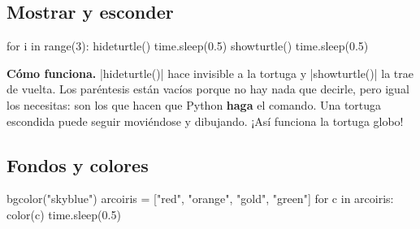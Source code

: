 \subsection*{Mostrar y esconder}

\begin{tcbraster}[raster columns=2, raster equal height=rows, raster column skip=12pt, raster valign=center]
\begin{tcolorbox}[colback=white, colframe=white, boxrule=0pt, valign=center]
\begin{scratch}
\end{scratch}
\end{tcolorbox}
\begin{code}
for i in range(3):
    hideturtle()
    time.sleep(0.5)
    showturtle()
    time.sleep(0.5)
\end{code}
\end{tcbraster}

\textbf{Cómo funciona.} \py|hideturtle()| hace invisible a la tortuga y \py|showturtle()| la trae de vuelta. Los paréntesis están vacíos porque no hay nada que decirle, pero igual los necesitas: son los que hacen que Python \textbf{haga} el comando. Una tortuga escondida puede seguir moviéndose y dibujando. ¡Así funciona la tortuga globo!

\subsection*{Fondos y colores}

\begin{tcbraster}[raster columns=2, raster equal height=rows, raster column skip=12pt, raster valign=center]
\begin{tcolorbox}[colback=white, colframe=white, boxrule=0pt, valign=center]
\begin{scratch}[scale=0.94]
\end{scratch}
\end{tcolorbox}
\begin{code}
bgcolor("skyblue")
arcoiris = ["red", "orange",
            "gold", "green"]
for c in arcoiris:
    color(c)
    time.sleep(0.5)
\end{code}
\end{tcbraster}

